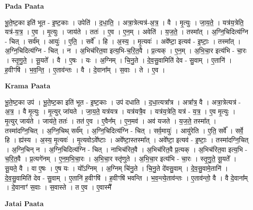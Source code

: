 \documentclass[17pt]{extarticle}
\begin{document}
\textbf{Pada Paata} \newline

भू॒ते॒ष्ट॒का इति॑ भूत - इ॒ष्ट॒काः । उपेति॑ । द॒धा॒ति॒ । अत्रा॒त्रेत्यत्र॑-अ॒त्र॒ । वै । मृ॒त्युः । जा॒य॒ते॒ । यत्र॑य॒त्रेति॒ यत्र॑-य॒त्र॒ । ए॒व । मृ॒त्युः । जाय॑ते । ततः॑ । ए॒व । ए॒न॒म् । अवेति॑ । य॒ज॒ते॒ । तस्मा᳚त् । अ॒ग्नि॒चिदित्य॑ग्नि - चित् । सर्व᳚म् । आयुः॑ । ए॒ति॒ । सर्वे᳚ । हि । अ॒स्य॒ । मृ॒त्यवः॑ । अवे᳚ष्टा॒ इत्यव॑ - इ॒ष्टाः॒ । तस्मा᳚त् । अ॒ग्नि॒चिदित्य॑ग्नि - चित् । न । अ॒भिच॑रित॒वा इत्य॒भि-च॒रि॒त॒वै । प्र॒त्यक् । ए॒न॒म् । अ॒भि॒चा॒र इत्य॑भि - चा॒रः । स्तृ॒णु॒ते॒ । सू॒यते᳚ । वै । ए॒षः । यः । अ॒ग्निम् । चि॒नु॒ते । दे॒व॒सु॒वामिति॑ देव - सु॒वाम् । ए॒तानि॑ । ह॒वीꣳषि॑ । भ॒व॒न्ति॒ । ए॒ताव॑न्तः । वै । दे॒वाना᳚म् । स॒वाः । ते । ए॒व ।  \newline


\textbf{Krama Paata} \newline

भू॒ते॒ष्ट॒का उप॑ । भू॒ते॒ष्ट॒का इति॑ भूत - इ॒ष्ट॒काः । उप॑ दधाति । द॒धा॒त्यत्रा᳚त्र । अत्रा᳚त्र॒ वै । अत्रा॒त्रेत्यत्र॑ - अ॒त्र॒ । वै मृ॒त्युः । मृ॒त्युर् जा॑यते । जा॒य॒ते॒ यत्र॑यत्र । यत्र॑यत्रै॒व । यत्र॑य॒त्रेति॒ यत्र॑ - य॒त्र॒ । ए॒व मृ॒त्युः । मृ॒त्युर् जाय॑ते । जाय॑ते॒ ततः॑ । तत॑ ए॒व । ए॒वैन᳚म् । ए॒न॒मव॑ । अव॑ यजते । य॒ज॒ते॒ तस्मा᳚त् । तस्मा॑दग्नि॒चित् । अ॒ग्नि॒चिथ् सर्व᳚म् । अ॒ग्नि॒चिदित्य॑ग्नि - चित् । सर्व॒मायुः॑ । आयु॑रेति । ए॒ति॒ सर्वे᳚ । सर्वे॒ हि । ह्य॑स्य । अ॒स्य॒ मृ॒त्यवः॑ । मृ॒त्यवोऽवे᳚ष्टाः । अवे᳚ष्टा॒स्तस्मा᳚त् । अवे᳚ष्टा॒ इत्यव॑ - इ॒ष्टाः॒ । तस्मा॑दग्नि॒चित् । अ॒ग्नि॒चिन् न । अ॒ग्नि॒चिदित्य॑ग्नि - चित् । नाभिच॑रित॒वै । अ॒भिच॑रित॒वै प्र॒त्यक् । अ॒भिच॑रित॒वा इत्य॒भि - च॒रि॒त॒वै । प्र॒त्यगे॑नम् । ए॒न॒म॒भि॒चा॒रः । अ॒भि॒चा॒र स्तृ॑णुते । अ॒भि॒चा॒र इत्य॑भि - चा॒रः । स्तृ॒णु॒ते॒ सू॒यते᳚ । सू॒यते॒ वै । वा ए॒षः । 
ए॒ष यः । यो᳚ऽग्निम् । अ॒ग्निम् चि॑नु॒ते । चि॒नु॒ते दे॑वसु॒वाम् । दे॒व॒सु॒वामे॒तानि॑ । दे॒व॒सु॒वामिति॑ देव - सु॒वाम् । ए॒तानि॑ ह॒वीꣳषि॑ । ह॒वीꣳषि॑ भवन्ति । भ॒व॒न्त्ये॒ताव॑न्तः । 
ए॒ताव॑न्तो॒ वै । वै दे॒वाना᳚म् । दे॒वानाꣳ॑ स॒वाः । स॒वास्ते । 
त ए॒व । ए॒वास्मै᳚ \newline

\textbf{Jatai Paata} \newline
\end{document}
